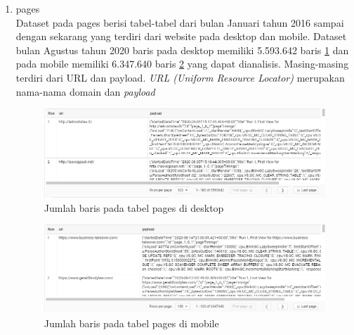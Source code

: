 \begin{enumerate}
	\item pages\\
	Dataset pada pages berisi tabel-tabel dari bulan Januari tahun 2016 sampai dengan sekarang yang terdiri dari website pada desktop dan mobile. Dataset bulan Agustus tahun 2020 baris pada desktop memiliki 5.593.642 baris \ref{fig:ct_pages_desktop} dan pada mobile memiliki 6.347.640 baris \ref{fig:ct_pages_mobile} yang dapat dianalisis. Masing-masing terdiri dari URL dan payload. \textit{URL (Uniform Resource Locator)} merupakan nama-nama domain dan \textit{payload}
	\begin{figure}[H]
		\centering  
		\includegraphics[scale=0.65]{Gambar/2020_08_01_desktop_jumlah_baris_pages.PNG}  
		\caption{Jumlah baris pada tabel pages di desktop} 
		\label{fig:ct_pages_desktop} 
	\end{figure}
	
	\begin{figure}[H]
		\centering  
		\includegraphics[scale=0.65]{Gambar/2020_08_01_mobile_jumlah_baris_pages.PNG}  
		\caption{Jumlah baris pada tabel pages di mobile} 
		\label{fig:ct_pages_mobile} 
	\end{figure}
	

\end{enumerate}
